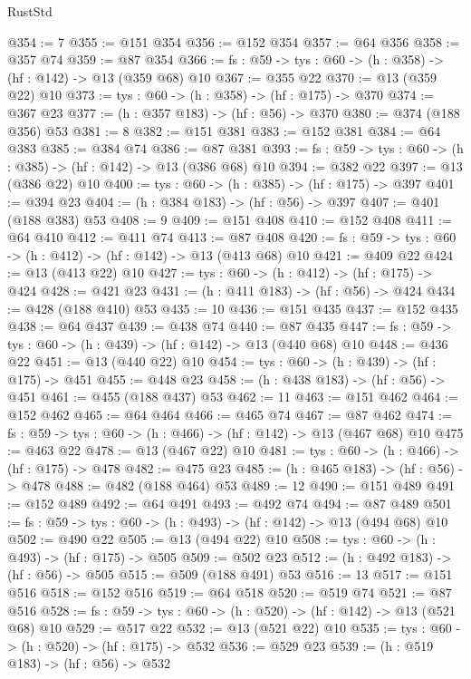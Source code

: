 \begin{lexlean}{RustStd}
\begin{coremodule}
@354 := 7
@355 := @151 @354
@356 := @152 @354
@357 := @64 @356
@358 := @357 @74
@359 := @87 @354
@366 := {fs : @59} -> {tys : @60} -> (h : @358) -> (hf : @142) -> @13 (@359 @68) @10
@367 := @355 @22
@370 := @13 (@359 @22) @10
@373 := {tys : @60} -> (h : @358) -> (hf : @175) -> @370
@374 := @367 @23
@377 := (h : @357 @183) -> (hf : @56) -> @370
@380 := @374 (@188 @356) @53
@381 := 8
@382 := @151 @381
@383 := @152 @381
@384 := @64 @383
@385 := @384 @74
@386 := @87 @381
@393 := {fs : @59} -> {tys : @60} -> (h : @385) -> (hf : @142) -> @13 (@386 @68) @10
@394 := @382 @22
@397 := @13 (@386 @22) @10
@400 := {tys : @60} -> (h : @385) -> (hf : @175) -> @397
@401 := @394 @23
@404 := (h : @384 @183) -> (hf : @56) -> @397
@407 := @401 (@188 @383) @53
@408 := 9
@409 := @151 @408
@410 := @152 @408
@411 := @64 @410
@412 := @411 @74
@413 := @87 @408
@420 := {fs : @59} -> {tys : @60} -> (h : @412) -> (hf : @142) -> @13 (@413 @68) @10
@421 := @409 @22
@424 := @13 (@413 @22) @10
@427 := {tys : @60} -> (h : @412) -> (hf : @175) -> @424
@428 := @421 @23
@431 := (h : @411 @183) -> (hf : @56) -> @424
@434 := @428 (@188 @410) @53
@435 := 10
@436 := @151 @435
@437 := @152 @435
@438 := @64 @437
@439 := @438 @74
@440 := @87 @435
@447 := {fs : @59} -> {tys : @60} -> (h : @439) -> (hf : @142) -> @13 (@440 @68) @10
@448 := @436 @22
@451 := @13 (@440 @22) @10
@454 := {tys : @60} -> (h : @439) -> (hf : @175) -> @451
@455 := @448 @23
@458 := (h : @438 @183) -> (hf : @56) -> @451
@461 := @455 (@188 @437) @53
@462 := 11
@463 := @151 @462
@464 := @152 @462
@465 := @64 @464
@466 := @465 @74
@467 := @87 @462
@474 := {fs : @59} -> {tys : @60} -> (h : @466) -> (hf : @142) -> @13 (@467 @68) @10
@475 := @463 @22
@478 := @13 (@467 @22) @10
@481 := {tys : @60} -> (h : @466) -> (hf : @175) -> @478
@482 := @475 @23
@485 := (h : @465 @183) -> (hf : @56) -> @478
@488 := @482 (@188 @464) @53
@489 := 12
@490 := @151 @489
@491 := @152 @489
@492 := @64 @491
@493 := @492 @74
@494 := @87 @489
@501 := {fs : @59} -> {tys : @60} -> (h : @493) -> (hf : @142) -> @13 (@494 @68) @10
@502 := @490 @22
@505 := @13 (@494 @22) @10
@508 := {tys : @60} -> (h : @493) -> (hf : @175) -> @505
@509 := @502 @23
@512 := (h : @492 @183) -> (hf : @56) -> @505
@515 := @509 (@188 @491) @53
@516 := 13
@517 := @151 @516
@518 := @152 @516
@519 := @64 @518
@520 := @519 @74
@521 := @87 @516
@528 := {fs : @59} -> {tys : @60} -> (h : @520) -> (hf : @142) -> @13 (@521 @68) @10
@529 := @517 @22
@532 := @13 (@521 @22) @10
@535 := {tys : @60} -> (h : @520) -> (hf : @175) -> @532
@536 := @529 @23
@539 := (h : @519 @183) -> (hf : @56) -> @532

\end{coremodule}
\end{lexlean}
